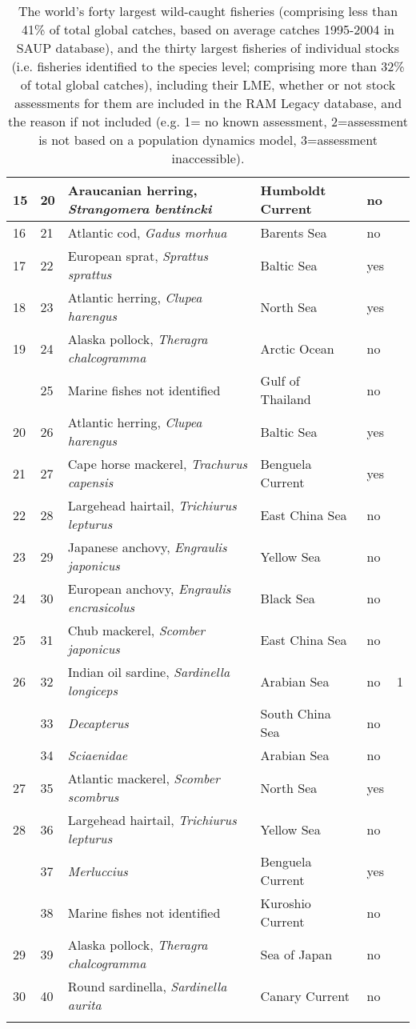 \documentclass[letterpaper,12pt]{article}
\begin{document}
\begin{landscape}
\begin{longtable}{p{2cm} | p{2cm} | p{5cm} | l | p{2cm} | p{2cm}}
15 & 20& Araucanian herring, \textit{Strangomera bentincki} & Humboldt Current & no & \\ \hline
16 & 21& Atlantic cod, \textit{Gadus morhua} & Barents Sea & no & \\ \hline
17 & 22& European sprat, \textit{Sprattus sprattus} & Baltic Sea & yes & \\ \hline
18 & 23& Atlantic herring, \textit{Clupea harengus} & North Sea & yes & \\ \hline
19 & 24& Alaska pollock, \textit{Theragra chalcogramma} & Arctic Ocean & no & \\ \hline
 & 25& Marine fishes not identified & Gulf of Thailand & no & \\
20 & 26& Atlantic herring, \textit{Clupea harengus} & Baltic Sea & yes & \\ \hline
21 & 27& Cape horse mackerel, \textit{Trachurus capensis} & Benguela Current & yes & \\ \hline
22 & 28& Largehead hairtail, \textit{Trichiurus lepturus} & East China Sea & no & \\ \hline
23 & 29& Japanese anchovy, \textit{Engraulis japonicus} & Yellow Sea & no & \\ \hline
24 & 30& European anchovy, \textit{Engraulis encrasicolus} & Black Sea & no & \\ \hline
25 & 31& Chub mackerel, \textit{Scomber japonicus} & East China Sea & no & \\ \hline
26 & 32& Indian oil sardine, \textit{Sardinella longiceps} & Arabian Sea & no & 1\\ \hline
 & 33& \textit{Decapterus} & South China Sea & no & \\
 & 34& \textit{Sciaenidae} & Arabian Sea & no & \\
27 & 35& Atlantic mackerel, \textit{Scomber scombrus} & North Sea & yes & \\ \hline
28 & 36& Largehead hairtail, \textit{Trichiurus lepturus} & Yellow Sea & no & \\ \hline
 & 37& \textit{Merluccius} & Benguela Current & yes & \\
 & 38& Marine fishes not identified & Kuroshio Current & no & \\
29 & 39& Alaska pollock, \textit{Theragra chalcogramma} & Sea of Japan & no & \\ \hline
30 & 40& Round sardinella, \textit{Sardinella aurita} & Canary Current & no & \\ \hline
\caption{The world's forty largest wild-caught fisheries (comprising less than 41\% of total global catches, based on average catches 1995-2004 in SAUP database), and the thirty largest fisheries of individual stocks (i.e. fisheries identified to the species level; comprising more than 32\% of total global catches), including their LME, whether or not stock assessments for them are included in the RAM Legacy database, and the reason if not included (e.g. 1= no known assessment, 2=assessment is not based on a population dynamics model, 3=assessment inaccessible).}\\

\end{longtable}
\end{landscape}
\end{document}
